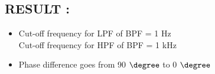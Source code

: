 \documentclass[12pt]{article}
\begin{document}
\subsection{\textbf{RESULT} : }
\begin{itemize}
	\item Cut-off frequency for LPF of BPF = 1 Hz \\
	      Cut-off frequency for HPF of BPF = 1 kHz
	\item Phase difference goes from 90 $\degree$ to 0 $\degree$ 
\end{itemize}
\end{document}
